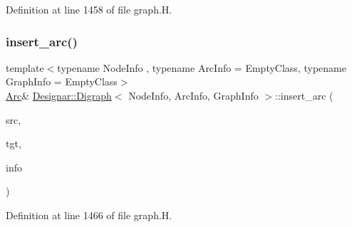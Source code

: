 Definition at line 1458 of file graph.\+H.

\mbox{\label{class_designar_1_1_digraph_a58d7f0e13a9e42cbc9e28683b527ca72}} 
\subsubsection{\texorpdfstring{insert\+\_\+arc()}{insert\_arc()}\hspace{0.1cm}{\footnotesize\ttfamily [3/4]}}
{\footnotesize\ttfamily template$<$typename Node\+Info , typename Arc\+Info  = Empty\+Class, typename Graph\+Info  = Empty\+Class$>$ \\
\hyperlink{class_designar_1_1_digraph_a0ceb278671f2a535c00fddccdeafd69f}{Arc}\& \hyperlink{class_designar_1_1_digraph}{Designar\+::\+Digraph}$<$ Node\+Info, Arc\+Info, Graph\+Info $>$\+::insert\+\_\+arc (\begin{DoxyParamCaption}\item[{\hyperlink{class_designar_1_1_digraph_a4dc921c41a480b7946a04170e997d8ae}{Node} \&}]{src,  }\item[{\hyperlink{class_designar_1_1_digraph_a4dc921c41a480b7946a04170e997d8ae}{Node} \&}]{tgt,  }\item[{const Arc\+Info \&}]{info }\end{DoxyParamCaption})\hspace{0.3cm}{\ttfamily [inline]}}



Definition at line 1466 of file graph.\+H.

\mbox{\label{class_designar_1_1_digraph_a9e46012a65696859c131d0bc5e096f55}} 
